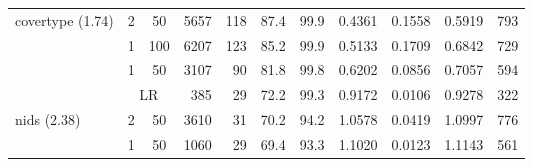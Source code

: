 \begin{tabular}{l ccr rrrrrrr}
		
  \midrule\multirow{4}{*}{covertype (1.74)} &                  2 & 50 &  5657 & 118 &  87.4 & 99.9 & 0.4361 &  0.1558 & 0.5919 &  793 \\
                                            &                 1 & 100 &  6207 & 123 &  85.2 & 99.9 & 0.5133 &  0.1709 & 0.6842 &  729 \\
                                            &                  1 & 50 &  3107 &  90 &  81.8 & 99.8 & 0.6202 &  0.0856 & 0.7057 &  594 \\
                                            &  \multicolumn{2}{c}{LR} &   385 &  29 &  72.2 & 99.3 & 0.9172 &  0.0106 & 0.9278 &  322 \\
       \midrule\multirow{4}{*}{nids (2.38)} &                  2 & 50 &  3610 &  31 &  70.2 & 94.2 & 1.0578 &  0.0419 & 1.0997 &  776 \\
                                            &                  1 & 50 &  1060 &  29 &  69.4 & 93.3 & 1.1020 &  0.0123 & 1.1143 &  561 \\

\end{tabular}
